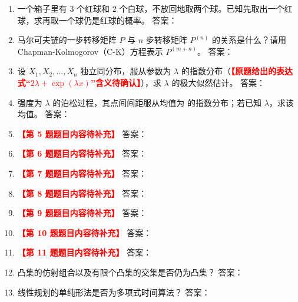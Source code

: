 \documentclass[12pt,a4paper,UTF8,fontset=fandol]{ctexart}
\newcommand{\ph}[1]{\textcolor{red}{\textbf{【#1】}}}
\begin{document}
\begin{enumerate}[label=（\arabic*）]
  \item 一个箱子里有 3 个红球和 2 个白球，不放回地取两个球。已知先取出一个红球，求再取一个球仍是红球的概率。 \hfill 答案：\underline{\hspace{4cm}}
  \item 马尔可夫链的一步转移矩阵 $P$ 与 $n$ 步转移矩阵 $P^{(n)}$ 的关系是什么？请用 Chapman-Kolmogorov（C-K）方程表示 $P^{(m+n)}$。 \hfill 答案：\underline{\hspace{4cm}}
  \item 设 $X_1, X_2, \dots, X_n$ 独立同分布，服从参数为 $\lambda$ 的指数分布（\ph{原题给出的表达式“$2\lambda + \exp(\lambda x)$”含义待确认}），求 $\lambda$ 的极大似然估计。 \hfill 答案：\underline{\hspace{4cm}}
  \item 强度为 $\lambda$ 的泊松过程，其点间间距服从均值为 \underline{\hspace{2.5cm}} 的指数分布；若已知 $\lambda$，求该均值。 \hfill 答案：\underline{\hspace{4cm}}
  \item \ph{第 5 题题目内容待补充} \hfill 答案：\underline{\hspace{4cm}}
  \item \ph{第 6 题题目内容待补充} \hfill 答案：\underline{\hspace{4cm}}
  \item \ph{第 7 题题目内容待补充} \hfill 答案：\underline{\hspace{4cm}}
  \item \ph{第 8 题题目内容待补充} \hfill 答案：\underline{\hspace{4cm}}
  \item \ph{第 9 题题目内容待补充} \hfill 答案：\underline{\hspace{4cm}}
  \item \ph{第 10 题题目内容待补充} \hfill 答案：\underline{\hspace{4cm}}
  \item \ph{第 11 题题目内容待补充} \hfill 答案：\underline{\hspace{4cm}}
  \item 凸集的仿射组合以及有限个凸集的交集是否仍为凸集？ \hfill 答案：\underline{\hspace{4cm}}
  \item 线性规划的单纯形法是否为多项式时间算法？ \hfill 答案：\underline{\hspace{4cm}}
\end{enumerate}
\end{document}
